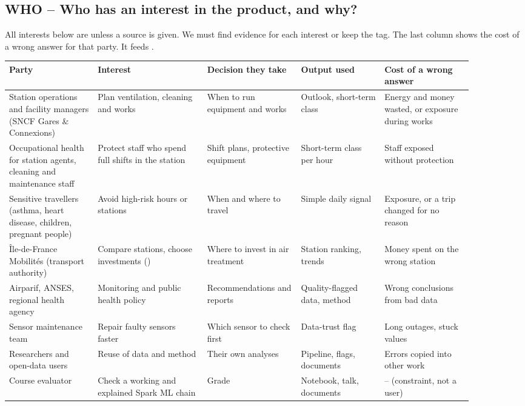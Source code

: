 \documentclass[11pt]{article}
\begin{document}
\subsection{WHO -- Who has an interest in the product, and why?}
All interests below are \tAssumed{} unless a source is given. We must find evidence for each interest or keep the tag.
The last column shows the cost of a wrong answer for that party. It feeds .

\small
\begin{longtable}{@{}P{0.17\linewidth} P{0.21\linewidth} P{0.18\linewidth} P{0.16\linewidth} P{0.17\linewidth}@{}}
\toprule
\textbf{Party} & \textbf{Interest} & \textbf{Decision they take} & \textbf{Output used} & \textbf{Cost of a wrong answer} \\
\midrule\endhead
\bottomrule\endfoot
Station operations and facility managers (SNCF Gares \& Connexions) & Plan ventilation, cleaning and works & When to run equipment and works & Outlook, short-term class & Energy and money wasted, or exposure during works \\
Occupational health for station agents, cleaning and maintenance staff & Protect staff who spend full shifts in the station & Shift plans, protective equipment & Short-term class per hour & Staff exposed without protection \\
Sensitive travellers (asthma, heart disease, children, pregnant people) & Avoid high-risk hours or stations & When and where to travel & Simple daily signal & Exposure, or a trip changed for no reason \\
Île-de-France Mobilités (transport authority) & Compare stations, choose investments () & Where to invest in air treatment & Station ranking, trends & Money spent on the wrong station \\
Airparif, ANSES, regional health agency & Monitoring and public health policy & Recommendations and reports & Quality-flagged data, method & Wrong conclusions from bad data \\
Sensor maintenance team & Repair faulty sensors faster & Which sensor to check first & Data-trust flag & Long outages, stuck values \\
Researchers and open-data users & Reuse of data and method & Their own analyses & Pipeline, flags, documents & Errors copied into other work \\
Course evaluator & Check a working and explained Spark ML chain & Grade & Notebook, talk, documents & -- (constraint, not a user) \\
\end{longtable}
\normalsize
\end{document}
